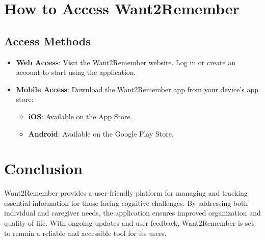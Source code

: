 \documentclass{article}
\begin{document}
\section{How to Access Want2Remember}

\subsection{Access Methods}

\begin{itemize}
\item \textbf{Web Access}: Visit the Want2Remember website. Log in or create an account to start using the application.
\item \textbf{Mobile Access}: Download the Want2Remember app from your device’s app store:
\begin{itemize}
\item \textbf{iOS}: Available on the App Store.
\item \textbf{Android}: Available on the Google Play Store.
\end{itemize}
\end{itemize}

\section*{Conclusion}
Want2Remember provides a user-friendly platform for managing and tracking essential information for those facing cognitive challenges. By addressing both individual and caregiver needs, the application ensures improved organization and quality of life. With ongoing updates and user feedback, Want2Remember is set to remain a reliable and accessible tool for its users.
\end{document}

